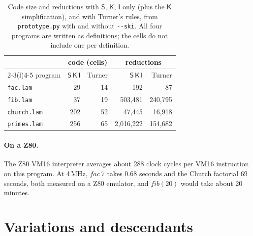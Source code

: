 \documentclass[11pt,a4paper]{article}
\newcommand{\cmb}[1]{\textsf{#1}}
\newcommand{\I}{\cmb{I}}
\newcommand{\K}{\cmb{K}}
\newcommand{\Sc}{\cmb{S}}
\theoremstyle{definition}
\theoremstyle{plain}
\begin{document}
\begin{table}[t]
\centering
\small
\begin{tabular}{@{}l r r r r@{}}
\toprule
 & \multicolumn{2}{c}{code (cells)} & \multicolumn{2}{c}{reductions}\\
\cmidrule(lr){2-3}\cmidrule(l){4-5}
program & $\Sc\,\K\,\I$ & Turner & $\Sc\,\K\,\I$ & Turner\\
\midrule
\texttt{fac.lam} & 29 & 14 & 192 & 87\\
\texttt{fib.lam} & 37 & 19 & 503,481 & 240,795\\
\texttt{church.lam} & 202 & 52 & 47,445 & 16,918\\
\texttt{primes.lam} & 256 & 65 & 2,016,222 & 154,682\\
\bottomrule
\end{tabular}
\caption{Code size and reductions with $\Sc$, $\K$, $\I$ only (plus the
$\K$ simplification), and with Turner's rules, from \texttt{prototype.py}
with and without \texttt{-{}-ski}. All four programs are written as
definitions; the cells do not include one per definition.}
\label{tab:sizes}
\end{table}

\paragraph{On a Z80.} The Z80 VM16 interpreter averages about 288 clock
cycles per VM16 instruction on this program. At 4\,MHz, $\mathit{fac}\ 7$ takes
0.68 seconds and the Church factorial 69 seconds, both measured on a Z80
emulator, and $\mathit{fib}(20)$ would take about 20 minutes.

\section{Variations and descendants}\label{sec:descendants}
\end{document}
